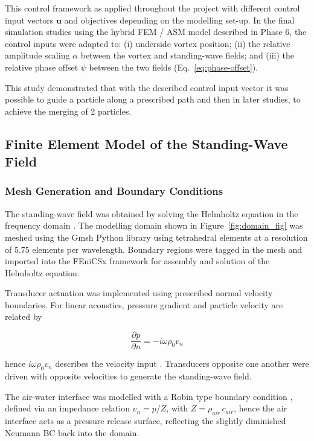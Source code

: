 \documentclass[11pt,a4paper]{article}
\begin{document}
This control framework as applied throughout the project with different control input vectors $\mathbf{u}$ and objectives depending on the modelling set-up. In the final simulation studies using the hybrid FEM / ASM model described in Phase 6, the control inputs were adapted to: (i) underside vortex position; (ii) the relative amplitude scaling $\alpha$ between the vortex and standing-wave fields; and (iii) the relative phase offset $\psi$ between the two fields (Eq.~\ref{eq:phase-offset}).

This study demonstrated that with the described control input vector it was possible to guide a particle along a prescribed path and then in later studies, to achieve the merging of 2 particles.

\subsection{Finite Element Model of the Standing-Wave Field}
\label{subsubsec:fem-standing-wave}

\subsubsection{Mesh Generation and Boundary Conditions}
\label{subsubsec:mesh-gen}

The standing-wave field was obtained by solving the Helmholtz equation in the frequency domain \cite{kinsler2000acoustics}. The modelling domain shown in Figure~\ref{fig:domain_fig} was meshed using the Gmsh Python library\cite{gmsh_manual} using tetrahedral elements at a resolution of 5.75 elements per wavelength. Boundary regions were tagged in the mesh and imported into the FEniCSx framework \cite{baratta2023dolfinx, logg2012fenics} for assembly and solution of the Helmholtz equation. 

Transducer actuation was implemented using prescribed normal velocity boundaries. For linear acoustics, pressure gradient and particle velocity are related by 

\begin{equation}
\frac{\partial p}{\partial n}
=
- i \omega \rho_0 v_n
\label{eq:neumann}
\end{equation}

\noindent hence $i \omega \rho_0 v_n$ describes the velocity input \cite{ihlenburg1998finite}. Transducers opposite one another were driven with opposite velocities to generate the standing-wave field. 

The air-water interface was modelled with a Robin type boundary condition \cite{ihlenburg1998finite}, defined via an impedance relation $v_n = p/Z$,  with  $Z = \rho_{air}\, c_{air}$, hence the air interface acts as a pressure release surface, reflecting the slightly diminished Neumann BC back into the domain.
\end{document}
